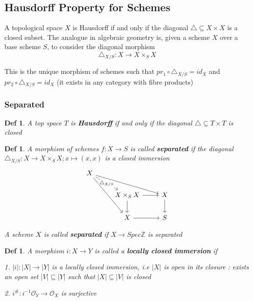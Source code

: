\documentclass{article}
\newtheorem{definition}[theorem]{Def}
\begin{document}
\newpage
\subsection{Hausdorff Property for Schemes}

A topological space $X$ is Hausdorff if and only if the diagonal $\triangle \subseteq X\times X$ is a closed subset. The analogue in algebraic geometry is, given a scheme $X$ over a base scheme $S$, to consider the diagonal morphism
$$\triangle_{X/S}:X \to X\times_SX$$

This is the unique morphism of schemes such that $pr_1\circ \triangle_{X/S} = id_X$ and $pr_2\circ \triangle_{X/S} = id_X$ (it exists in any category with fibre products)

\subsubsection{Separated}

\begin{definition}
    A top space $T$ is \textbf{Hausdorff} if and only if the diagonal $\triangle \subseteq T \times T$ is closed
\end{definition}

\begin{definition}
    A morphism of schemes $f : X \to S$ is called \textbf{separated} if the diagonal $\triangle_{X/S} : X \to X \times_S X; x \mapsto (x, x)$ is a closed immersion 
    \[\begin{tikzcd}
	X \\
	& { X \times_S X} & X \\
	& X & S
	\arrow[from=2-2, to=3-2]
	\arrow[from=3-2, to=3-3]
	\arrow[from=2-3, to=3-3]
	\arrow[from=2-2, to=2-3]
	\arrow["{\triangle_{X/S}}"{description}, dashed, from=1-1, to=2-2]
	\arrow[from=1-1, to=3-2]
	\arrow[from=1-1, to=2-3]
\end{tikzcd}\]

A scheme $X$ is called \textbf{separated} if $X \to Spec\mathbb Z$ is separated
\end{definition}

\begin{definition}
    A morphism $i : X \to Y$ is called a \textbf{locally closed immersion} if
    
1. $|i| : |X| \to |Y |$ is a locally closed immersion, i.e $|X|$ is open in its closure : exists an open set $|V| \subseteq |Y|$
such that $|X| \subseteq |V|$ is closed

2. $i^{\#} : i^{-1}\mathcal O_Y \to \mathcal O_X$ is surjective
\end{definition}
\end{document}
